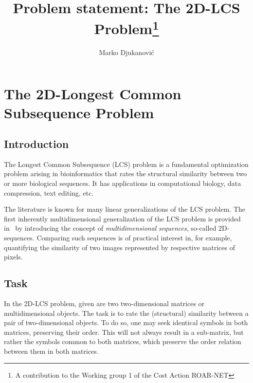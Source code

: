 \documentclass[]{article}
\title{\textbf{Problem statement: The 2D-LCS Problem}\footnote{A contribution to the Working group 1 of the Cost Action ROAR-NET }}
\author{Marko Djukanović}
\begin{document}
\maketitle



\section{The 2D-Longest Common Subsequence Problem}

\subsection{Introduction}

The Longest Common Subsequence (LCS) problem is a fundamental optimization problem arising in bioinformatics that rates the structural similarity between two or more biological sequences.
It has applications in computational biology, data compression, text editing, etc.  

The literature is known for many linear generalizations of the LCS problem. The first inherently multidimensional generalization of the LCS problem is provided in~\cite{2d_lcs_amir} by introducing the concept of \textit{multidimensional} \textit{sequences}, so-called 2D-sequences. Comparing such sequences is of practical interest in, for example, quantifying the similarity of two images represented by respective matrices of pixels. 


\subsection{Task}

In the 2D-LCS problem, given are two two-dimensional matrices or multidimensional objects. The task is 
to  rate the (structural) similarity
between a pair of two-dimensional objects.
To do so, one may seek identical symbols in both matrices, preserving their order. This will not always result in a sub-matrix, but rather the
symbols common to both matrices, which preserve the order relation between them in both matrices.   



\end{document}

